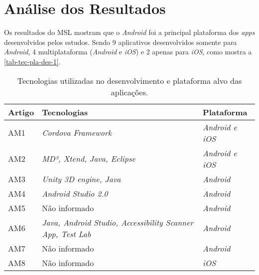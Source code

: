 \newpage

\section{Análise dos Resultados}

Os resultados do MSL mostram que o \emph{Android} foi a principal plataforma dos \emph{apps} desenvolvidos pelos estudos.
Sendo 9 aplicativos desenvolvidos somente para \emph{Android}, 4 multiplataforma (\emph{Android} e \emph{iOS}) e 2
apenas para \emph{iOS}, como mostra a \autoref{tab-tec-pla-des-1}.

\begin{table}[htb]
    \begin{center}
        \caption{Tecnologias utilizadas no desenvolvimento e plataforma alvo das aplicações.}
        \label{tab-tec-pla-des-1}
        \begin{tabular}{p{1.0cm}|p{8.0cm}|p{3.0cm}}
            \textbf{Artigo} & \textbf{Tecnologias}                                             & \textbf{Plataforma}  \\
            \hline
            AM1             & \emph{Cordova Framework}                                         & \emph{Android e iOS} \\
            \hline
            AM2             & \emph{MD², Xtend, Java, Eclipse}                                 & \emph{Android e iOS} \\
            \hline
            AM3             & \emph{Unity 3D engine, Java}                                     & \emph{Android}       \\
            \hline
            AM4             & \emph{Android Studio 2.0}                                        & \emph{Android}       \\
            \hline
            AM5             & Não informado                                                    & \emph{Android}       \\
            \hline
            AM6             & \emph{Java, Android Studio, Accessibility Scanner App, Test Lab} & \emph{Android}       \\
            \hline
            AM7             & Não informado                                                    & \emph{Android}       \\
            \hline
            AM8             & Não informado                                                    & \emph{iOS}           \\
            \hline

\end{tabular}
\end{center}
\end{table}
